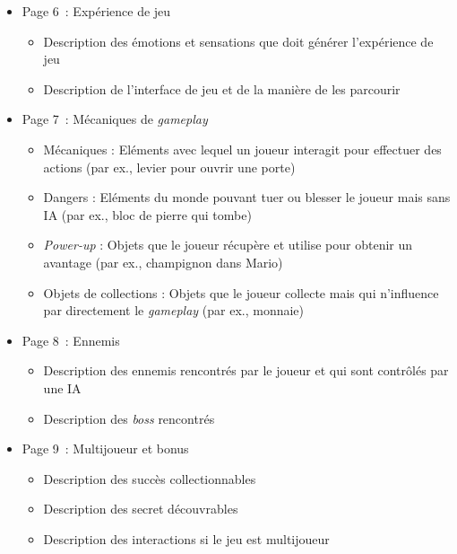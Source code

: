 \addtocounter{table}{-1}

\begin{table}
\footnotesize
\begin{framed}
\begin{itemize}
    \item Page 6~: Expérience de jeu
    \begin{itemize}
        \item Description des émotions et sensations que doit générer l'expérience de jeu
        \item Description de l'interface de jeu et de la manière de les parcourir 


    \end{itemize}
    \item Page 7~:  Mécaniques de \emph{gameplay}
    \begin{itemize}
        \item Mécaniques : Eléments avec lequel un joueur interagit pour effectuer des actions (par ex., levier pour ouvrir une porte)
        \item Dangers : Eléments du monde pouvant tuer ou blesser le joueur mais sans IA (par ex., bloc de pierre qui tombe)
        \item \emph{Power-up} : Objets que le joueur récupère et utilise pour obtenir un avantage (par ex., champignon dans Mario)
        \item Objets de collections : Objets que le joueur collecte mais qui n'influence par directement le \emph{gameplay} (par ex.,  monnaie)
    \end{itemize}
    \item Page 8~: Ennemis
    \begin{itemize}
        \item Description des ennemis rencontrés par le joueur et qui sont contrôlés par une IA
        \item Description des \emph{boss} rencontrés
    \end{itemize}
    \item Page 9~: Multijoueur et bonus
    \begin{itemize}
        \item Description des succès collectionnables
        \item Description des secret découvrables
        \item Description des interactions si le jeu est multijoueur
    \end{itemize}

\end{itemize}
\end{framed}
\end{table}

